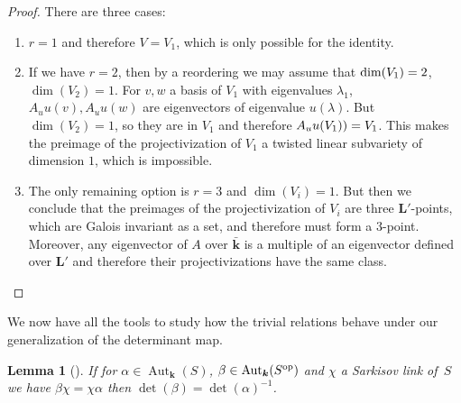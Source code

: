 \documentclass[JEP,XML,SOM,Unicode,NoFloatCountersInSection, NoEqCountersInSection,published]{cedram}
\newcommand{\op}{\textup{op}}
\newtheorem{lemma}[theorem]{Lemma}
\theoremstyle{definition}
\newcommand{\kk}{{\boldsymbol{k}}}
\newcommand{\LL}{{\boldsymbol{L}}}
\DeclareMathOperator{\Aut}{Aut}
\begin{document}
\begin{proof}
There are three cases:
\begin{enumerate}
\item $r = 1$ and therefore $V = V_1$, which is only possible for the identity.
\item If we have $r=2$, then by a reordering we may assume that $\dim(V_1) =\nobreak 2$, $\dim(V_2) = 1$. For $v, w$ a basis of $V_1$ with eigenvalues $\lambda_1$, $A_u u(v), A_u u(w)$
are eigenvectors of eigenvalue $u(\lambda)$. But $\dim(V_2) = 1$, so they are in $V_1$ and therefore $A_uu(V_1)) =\nobreak V_1$. This makes the preimage of the projectivization of $V_1$ a twisted linear subvariety of dimension $1$, which is impossible.
\item The only remaining option is $r=3$ and $\dim(V_i) = 1$. But then we conclude that the preimages of the projectivization of $V_i$ are three $\LL'$-points, which are Galois invariant as a set, and therefore must form a $3$\nobreakdash-point. Moreover, any eigenvector of $A$ over $\bar{\kk}$ is a multiple of an eigenvector defined over $\LL'$ and therefore their projectivizations have the same class.\qedhere
\end{enumerate}
\end{proof}

We now have all the tools to study how the trivial relations behave under our generalization of the determinant map.

\begin{lemma}[\cite{BSYUnp}] \label{DetTrivRef}
If for $\alpha \in \Aut_{\kk}(S)$, $\beta \in \Aut_{\kk}(S^{\op})$ and $\chi$ a Sarkisov link of~$S$ we have $\beta \chi = \chi \alpha$ then $\det(\beta) = \det(\alpha)^{-1}$.
\end{lemma}
\end{document}
